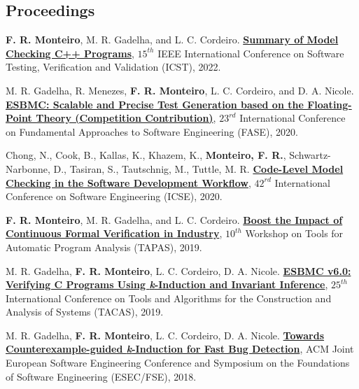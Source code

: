 \documentclass[letterpaper]{article}
\renewenvironment{itemize}{
  \begin{list}{}{
    \setlength{\leftmargin}{1.5em}
  }
}{
  \end{list}
}
\begin{document}
\subsection*{Proceedings}

\begin{itemize}   
    \item {\bf F. R. Monteiro}, M. R. Gadelha, and L. C. Cordeiro. \href{https://www.research.manchester.ac.uk/portal/en/publications/summary-of-model-checking-c-programs(f4b1fd51-76a1-42bb-87b0-4c30b2148d3a).html}{{\bf Summary of Model Checking C++ Programs}},
   $15^{th}$ IEEE International Conference on Software Testing, Verification and Validation (ICST), 2022.
 
    \item M. R. Gadelha, R. Menezes, {\bf F. R. Monteiro}, L. C. Cordeiro, and D. A. Nicole. \href{https://test-comp.sosy-lab.org/2020/}{{\bf ESBMC: Scalable and Precise Test Generation based on the Floating-Point Theory (Competition Contribution)}},
   $23^{rd}$ International Conference on Fundamental Approaches to Software Engineering (FASE), 2020.

    \item Chong, N., Cook, B., Kallas, K., Khazem, K., {\bf Monteiro, F. R.}, Schwartz-Narbonne, D., Tasiran, S., Tautschnig, M., Tuttle, M. R. \href{https://dl.acm.org/doi/pdf/10.1145/3377813.3381347}{{\bf Code-Level Model Checking in the Software Development Workflow}},
   $42^{rd}$ International Conference on Software Engineering (ICSE), 2020.
   
    \item {\bf F. R. Monteiro}, M. R. Gadelha, and L. C. Cordeiro. \href{https://staticanalysis.org/tapas2019/talks/tapas19-pre.pdf}{{\bf Boost the Impact of Continuous Formal Verification in Industry}},
   $10^{th}$ Workshop on Tools for Automatic Program Analysis (TAPAS), 2019.
 
    \item M. R. Gadelha, {\bf F. R. Monteiro}, L. C. Cordeiro, D. A. Nicole. \href{https://link.springer.com/chapter/10.1007/978-3-030-17502-3_15}{{\bf ESBMC v6.0: Verifying C Programs Using {\emph k}-Induction and Invariant Inference}},
   $25^{th}$ International Conference on Tools and Algorithms for the Construction and Analysis of Systems (TACAS), 2019.
   
    \item M. R. Gadelha, {\bf F. R. Monteiro}, L. C. Cordeiro, D. A. Nicole. \href{https://ssvlab.github.io/lucasccordeiro/papers/fse2018.pdf}{{\bf Towards Counterexample-guided {\emph k}-Induction for Fast Bug Detection}},
   ACM Joint European Software Engineering Conference and Symposium on the Foundations of Software Engineering (ESEC/FSE), 2018.
  

\end{itemize}
\end{document}
